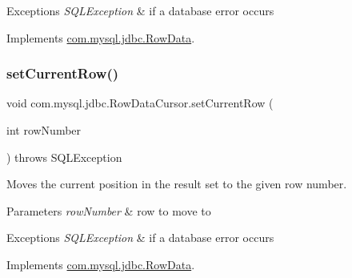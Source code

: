 \begin{DoxyExceptions}{Exceptions}
{\em S\+Q\+L\+Exception} & if a database error occurs \\
\hline
\end{DoxyExceptions}


Implements \mbox{\hyperlink{interfacecom_1_1mysql_1_1jdbc_1_1_row_data_ac60b2e20cd7043fb730f0977386e80be}{com.\+mysql.\+jdbc.\+Row\+Data}}.

\mbox{\label{classcom_1_1mysql_1_1jdbc_1_1_row_data_cursor_a530066237bc36be6444d4c8c0ae01be2}} 
\subsubsection{\texorpdfstring{set\+Current\+Row()}{setCurrentRow()}}
{\footnotesize\ttfamily void com.\+mysql.\+jdbc.\+Row\+Data\+Cursor.\+set\+Current\+Row (\begin{DoxyParamCaption}\item[{int}]{row\+Number }\end{DoxyParamCaption}) throws S\+Q\+L\+Exception}

Moves the current position in the result set to the given row number.


\begin{DoxyParams}{Parameters}
{\em row\+Number} & row to move to \\
\hline
\end{DoxyParams}

\begin{DoxyExceptions}{Exceptions}
{\em S\+Q\+L\+Exception} & if a database error occurs \\
\hline
\end{DoxyExceptions}


Implements \mbox{\hyperlink{interfacecom_1_1mysql_1_1jdbc_1_1_row_data_af1db64feefc1ecf2db53a72ec6063839}{com.\+mysql.\+jdbc.\+Row\+Data}}.

\mbox{\label{classcom_1_1mysql_1_1jdbc_1_1_row_data_cursor_a1547b71ee8de048e0299a8ec7a8b3ead}} 
